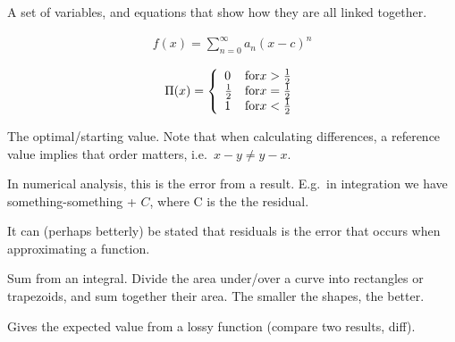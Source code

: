 \begin{definition}
    A set of variables, and equations that show how they are all linked 
    together.
\end{definition}

\begin{definition}\label{powerseries}
    \begin{align}
        f(x) = \sum\limits_{n=0}^{\infty}{a_{n}{(x-c)}^{n}}
    \end{align}
\end{definition}

\begin{definition}
    $$
    \Pi(x) = \left\{
            \begin{array}{l l}
                0 & \text{for} x > \frac{1}{2} \\
                \frac{1}{2} & \text{for} x = \frac{1}{2} \\
                1 & \text{for} x < \frac{1}{2} \\
            \end{array}
        \right.
    $$
\end{definition}

\begin{definition}
    The optimal/starting value. Note that when calculating differences,
    a reference value implies that order matters, i.e.\ $x - y \neq y - x$.

\end{definition}

\begin{definition}[Residual]
    In numerical analysis, this is the error from a result.
    E.g.\ in integration we have something-something + $C$, where C is the 
    the residual.

    It can (perhaps betterly) be stated that residuals is the error that occurs
    when approximating a function.

\end{definition}

\begin{definition}
    Sum from an integral. Divide the area under/over a curve into rectangles
    or trapezoids, and sum together their area. The smaller the shapes, the
    better.
\end{definition}

\begin{definition}
    Gives the expected value from a lossy function (compare two results, diff).
\end{definition}

